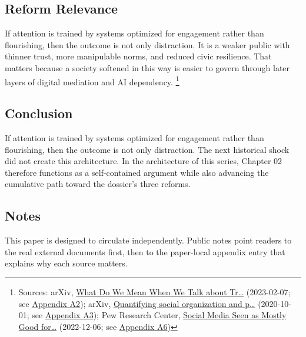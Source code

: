 \documentclass[
  american,
  11pt,
  letterpaper,
]{article}
\begin{document}
\subsection{Reform Relevance}\label{reform-relevance-2}

If attention is trained by systems optimized for engagement rather than
flourishing, then the outcome is not only distraction. It is a weaker
public with thinner trust, more manipulable norms, and reduced civic
resilience. That matters because a society softened in this way is
easier to govern through later layers of digital mediation and AI
dependency. \footnote{Sources: arXiv,
  \href{https://arxiv.org/abs/2302.03671}{What Do We Mean When We Talk
  about Tr\ldots{}} (2023-02-07; see
  \hyperref[ch-02-appendix-a2-what-do-we-mean-when-we-talk-about-trust-in-social-media-a-systematic-review]{Appendix
  A2}); arXiv, \href{https://arxiv.org/abs/2010.00590}{Quantifying
  social organization and p\ldots{}} (2020-10-01; see
  \hyperref[ch-02-appendix-a3-quantifying-social-organization-and-political-polarization-in-online-platforms]{Appendix
  A3}); Pew Research Center,
  \href{https://www.pewresearch.org/global/2022/12/06/social-media-seen-as-mostly-good-for-democracy-across-many-nations-but-u-s-is-a-major-outlier/}{Social
  Media Seen as Mostly Good for\ldots{}} (2022-12-06; see
  \hyperref[ch-02-appendix-a6-social-media-seen-as-mostly-good-for-democracy-across-many-nations-but-u-s-is-a-major-outlier]{Appendix
  A6})}

\subsection{Conclusion}\label{conclusion-2}

If attention is trained by systems optimized for engagement rather than
flourishing, then the outcome is not only distraction. The next
historical shock did not create this architecture. In the architecture
of this series, Chapter 02 therefore functions as a self-contained
argument while also advancing the cumulative path toward the dossier's
three reforms.

\subsection{Notes}\label{notes-2}

This paper is designed to circulate independently. Public notes point
readers to the real external documents first, then to the paper-local
appendix entry that explains why each source matters.
\end{document}
